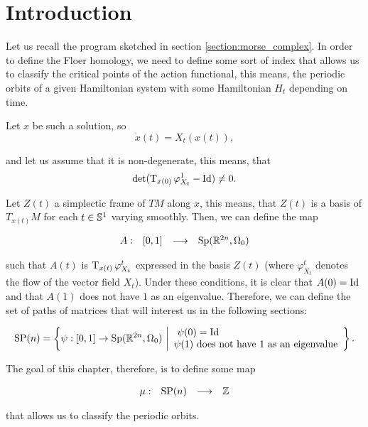 \section{Introduction}

Let us recall the program sketched in section \ref{section:morse_complex}. In order to define the Floer homology, we need to define some sort of index that allows us to classify the critical points of the action functional, this means, the periodic orbits of a given Hamiltonian system with some Hamiltonian $H_t$ depending on time.

Let $x$ be such a solution, so
\[\dot{x}(t) = X_t(x(t)) ,\]

and let us assume that it is non-degenerate, this means, that
\[\text{det}(\operatorname T_{x(0)} \varphi_{X_t}^1 - \text{Id}) \neq 0 .\]

Let $Z(t)$ a simplectic frame of $TM$ along $x$, this means, that $Z(t)$ is a basis of $T_{x(t)}M$ for each $t \in \mathbb{S}^1$ varying smoothly. Then, we can define the map

\[\begin{array}{rccc} A : & [0,1] & \longrightarrow & \text{Sp}(\mathbb{R}^{2n},\Omega_0) \end{array}\]

such that $A(t)$ is $\operatorname T_{x(t)} \varphi_{X_t}^t$ expressed in the basis $Z(t)$ (where $\varphi_{X_t}^t$ denotes the flow of the vector field $X_t$). Under these conditions, it is clear that $A(0) = \text{Id}$ and that $A(1)$ does not have $1$ as an eigenvalue. Therefore, we can define the set of paths of matrices that will interest us in the following sections:

\[\text{SP}(n) = \left\{ \psi : [0,1] \rightarrow \text{Sp}(\mathbb{R}^{2n},\Omega_0) \ \bigg| \begin{array}{l} \ \psi(0) = \text{Id} \\ \psi(1) \text{ does not have 1 as an eigenvalue} \end{array} \right\} .\]

The goal of this chapter, therefore, is to define some map

\[\begin{array}{rccc} \mu : & \text{SP}(n) & \longrightarrow & \mathbb{Z} \end{array}\]

that allows us to classify the periodic orbits.
